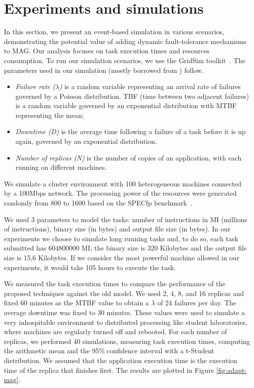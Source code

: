 \documentclass[times, 09pt, twocolumn]{article}
\begin{document}
\section{Experiments and simulations}\label{sec:eval}

In this section, we present an event-based simulation in various scenarios,
demonstrating the potential value of adding dynamic fault-tolerance mechanisms
to MAG. Our analysis focuses on task execution times and resources consumption.
To run our simulation scenarios, we use the GridSim toolkit~\cite{buyya02}. The
parameters used in our simulation (mostly borrowed from \cite{plank98,
beguelin97}) follow. 

\begin{itemize}
    \item \emph{Failure rate ($\lambda$)} is a random variable
representing an arrival rate of failures governed by a Poisson distribution.
TBF (time between two adjacent failures) is a random variable governed by an
exponential distribution with MTBF representing the mean;
    
    \item \emph{Downtime (D)} is the average time following a failure of a
task before it is up again, governed by an exponential distribution.
   
    \item \emph{Number of replicas (N)} is the number of copies of an
application, with each running on different machines.  
\end{itemize}

We simulate a cluster environment with 100 heterogeneous machines connected by
a 100Mbps network. The processing power of the resources were generated
randomly from 800 to 1600 based on the SPECfp benchmark~\cite{spec06}.

We used 3 parameters to model the tasks: number of instructions in MI (millions
of instructions), binary size (in bytes) and output file size (in bytes). In
our experiments we choose to simulate long running tasks and, to do so, each
task submitted has 604800000 MI, the binary size is 320 Kilobytes and the
output file size is 15,6 Kilobytes. If we consider the most powerful machine
allowed in our experiments, it would take 105 hours to execute the task.

We measured the task execution times to compare the performance of the proposed
techniques against the old model. We used 2, 4, 8, and 16 replicas and fixed 60
minutes as the MTBF value to obtain a $\lambda$ of 24 failures per day. The
average downtime was fixed to 30 minutes. These values were used to simulate a
very inhospitable environment to distributed processing like student
laboratories, where machines are regularly turned off and rebooted. For each
number of replicas, we performed 40 simulations, measuring task execution
times, computing the arithmetic mean and the 95\% confidence interval with a
t-Student distribution. We assumed that the application execution time is the
execution time of the replica that finishes first. The results are plotted in
Figure \ref{fig:adapt-mag}.
\end{document}
